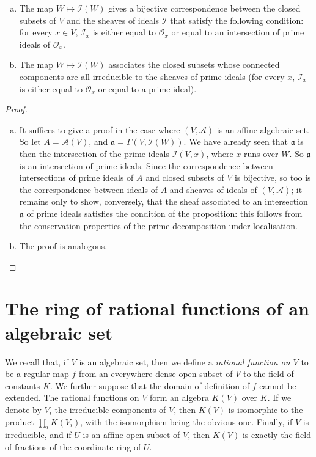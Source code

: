 \documentclass{article}
\theoremstyle{plain}
\newenvironment{proposition}[1]
    {\renewcommand\theinnerproposition{#1}\innerproposition}
    {\endinnerproposition}
\newcommand{\scr}[1]{{\mathscr{#1}}}
\begin{document}
\begin{proposition}{1}
\label{proposition1}
  \begin{enumerate}[(a)]
    \item The map $W\mapsto\scr{I}(W)$ gives a bijective correspondence between the closed subsets of $V$ and the sheaves of ideals $\scr{I}$ that satisfy the following condition:
      for every $x\in V$, $\scr{I}_x$ is either equal to $\scr{O}_x$ or equal to an intersection of prime ideals of $\scr{O}_x$.
    \item The map $W\mapsto\scr{I}(W)$ associates the closed subsets whose connected components are all irreducible to the sheaves of prime ideals (for every $x$, $\scr{I}_x$ is either equal to $\scr{O}_x$ or equal to a prime ideal).
  \end{enumerate}
\end{proposition}

\begin{proof}
  \begin{enumerate}[(a)]
    \item It suffices to give a proof in the case where $(V,\scr{A})$ is an affine algebraic set.
      So let $A=\scr{A}(V)$, and $\mathfrak{a}=\Gamma(V,\scr{I}(W))$.
      We have already seen that $\mathfrak{a}$ is then the intersection of the prime ideals $\scr{I}(V,x)$, where $x$ runs over $W$.
      So $\mathfrak{a}$ is an intersection of prime ideals.
      Since the correspondence between intersections of prime ideals of $A$ and closed subsets of $V$ is bijective, so too is the correspondence between ideals of $A$ and sheaves of ideals of $(V,\scr{A})$;
      it remains only to show, conversely, that the sheaf associated to an intersection $\mathfrak{a}$ of prime ideals satisfies the condition of the proposition: this follows from the conservation properties of the prime decomposition under localisation.
    \item The proof is analogous.
  \end{enumerate}
\end{proof}


\section{The ring of rational functions of an algebraic set}
\label{section3}

We recall that, if $V$ is an algebraic set, then we define a \emph{rational function on $V$} to be a regular map $f$ from an everywhere-dense open subset of $V$ to the field of constants $K$.
We further suppose that the domain of definition of $f$ cannot be extended.
The rational functions on $V$ form an algebra $K(V)$ over $K$.
If we denote by $V_i$ the irreducible components of $V$, then $K(V)$ is isomorphic to the product $\prod_i K(V_i)$, with the isomorphism being the obvious one.
Finally, if $V$ is irreducible, and if $U$ is an affine open subset of $V$, then $K(V)$ is exactly the field of fractions of the coordinate ring of $U$.
\end{document}
